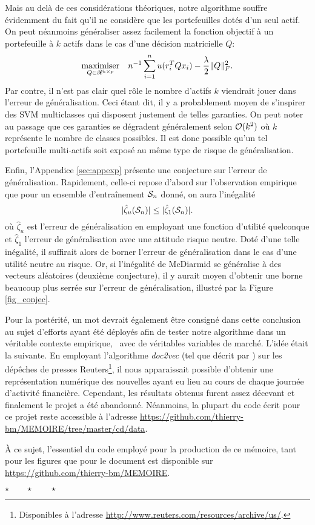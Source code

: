 Mais au delà de ces considérations théoriques, notre algorithme souffre évidemment du fait
qu'il ne considère que les portefeuilles dotés d'un seul actif. On peut néanmoins
généraliser assez facilement la fonction objectif à un portefeuille à $k$ actifs dans le
cas d'une décision matricielle $Q$:
\begin{equation}
  \maximizeEquation[Q \in \Re^{k \times p}]{n^{-1}\sumi u(r_i^TQ x_i) - \frac{\lambda}{2}\|Q\|^2_F.}
\end{equation}
Par contre, il n'est pas clair quel rôle le nombre d'actifs $k$ viendrait jouer dans
l'erreur de généralisation. Ceci étant dit, il y a probablement moyen de s'inspirer des
SVM multiclasses qui disposent justement de telles garanties. On peut noter au passage que
ces garanties se dégradent généralement selon $\bigO(k^2)$ où $k$ représente le nombre de
classes possibles. Il est donc possible qu'un tel portefeuille multi-actifs soit exposé au
même type de risque de généralisation. 

Enfin, l'Appendice \ref{sec:appexp} présente une conjecture sur l'erreur de
généralisation. Rapidement, celle-ci repose d'abord sur l'observation empirique que pour
un ensemble d'entraînement $\S_n$ donné, on aura l'inégalité
\begin{equation}
  |\hat\zeta_u(\S_n)| \leq |\hat\zeta_1(\S_n)|.
\end{equation}
où $\hat\zeta_u$ est l'erreur de généralisation en employant une fonction d'utilité quelconque
et $\hat\zeta_1$ l'erreur de généralisation avec une attitude risque neutre. Doté d'une telle
inégalité, il suffirait alors de borner l'erreur de généralisation dans le cas d'une
utilité neutre au risque. Or, si l'inégalité de McDiarmid se généralise à des vecteurs
aléatoires (deuxième conjecture), il y aurait moyen d'obtenir une borne beaucoup plus
serrée sur l'erreur de généralisation, illustré par la Figure \ref{fig_conjec}.

Pour la postérité, un mot devrait également être consigné dans cette conclusion au sujet
d'efforts ayant été déployés afin de tester notre algorithme dans un véritable contexte
empirique, \ie\ avec de véritables variables de marché. L'idée était la suivante. En
employant l'algorithme \textsl{doc2vec} (tel que décrit par \cite{le2014distributed}) sur
les dépêches de presses Reuters\footnote{Disponibles à l'adresse
  \url{http://www.reuters.com/resources/archive/us/}.}, il nous apparaissait possible
d'obtenir une représentation numérique des nouvelles ayant eu lieu au cours de chaque
journée d'activité financière. Cependant, les résultats obtenus furent assez décevant et
finalement le projet a été abandonné. Néanmoins, la plupart du code écrit pour ce projet
reste accessible à l'adresse
{\small\url{https://github.com/thierry-bm/MEMOIRE/tree/master/cd/data}}.

À ce sujet, l'essentiel du code employé pour la production de ce mémoire, tant pour les
figures que pour le document est disponible sur
{\small\url{https://github.com/thierry-bm/MEMOIRE}}.
\\[2cm]
\centerline{$\star \qquad \star \qquad \star$}

